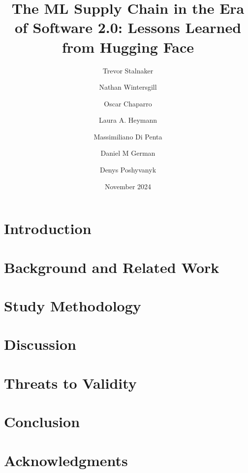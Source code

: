 \documentclass[acmsmall]{acmart}
\title{The ML Supply Chain in the Era of Software 2.0: Lessons Learned from Hugging Face}
\author{Trevor Stalnaker}
\affiliation{%
  \institution{William \& Mary}
  \city{Williamsburg, VA}
  \country{USA}
}
\author{Nathan Wintersgill}
\affiliation{%
  \institution{William \& Mary}
  \city{Williamsburg, VA}
  \country{USA}
}
\author{Oscar Chaparro}
\affiliation{%
  \institution{William \& Mary}
  \city{Williamsburg, VA}
  \country{USA}
}
\author{Laura A. Heymann}
\affiliation{%
  \institution{William \& Mary}
  \city{Williamsburg, VA}
  \country{USA}
}
\author{Massimiliano Di Penta}
\affiliation{%
  \institution{University of Sannio}
  \city{}
  \country{Italy}
}
\author{Daniel M German}
\affiliation{%
  \institution{University of Victoria}
  \city{Victoria}
  \country{Canada}
}
\author{Denys Poshyvanyk}
\affiliation{%
  \institution{William \& Mary}
  \city{Williamsburg, VA}
  \country{USA}
}
\date{November 2024}
\begin{document}
\maketitle

\section{Introduction}
\label{sec:intro}


\section{Background and Related Work}
\label{sec:back}


\section{Study Methodology}
\label{sec:design}




\section{Discussion}
\label{sec:implications}


\section{Threats to Validity}
\label{sec:threats}


\section{Conclusion}


\section{Acknowledgments}






\end{document}
